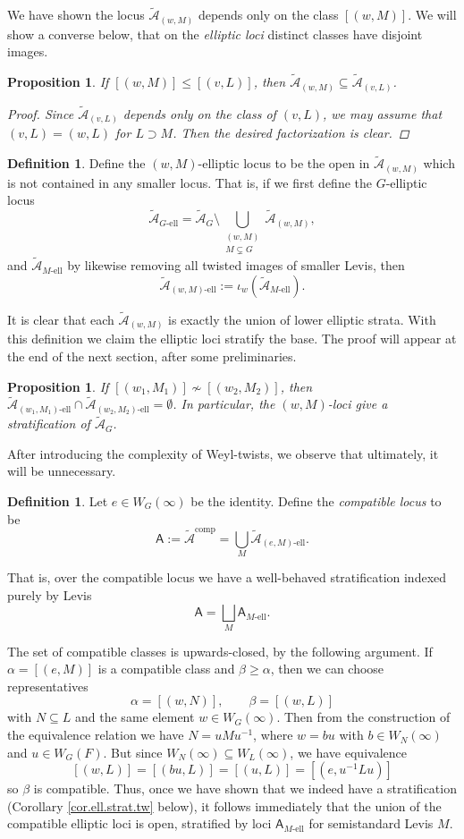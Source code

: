 \documentclass[openany]{amsbook}
\newtheorem{proposition}[theorem]{Proposition}
\theoremstyle{definition}
\newtheorem{definition}[theorem]{Definition}
\theoremstyle{remark}
\numberwithin{equation}{section}
\newcommand{\cA}{\mathcal{A}}
\renewcommand{\-}{\operatorname{-}}
\newcommand{\el}{\text{-ell}}
\newcommand{\ctA}{\widetilde{\cA}}
\newcommand{\ctAt}[2]{\ctA_{(#1,#2)}}
\newcommand{\ctAe}[2]{\ctA_{(#1, #2)\el}}
\newcommand{\bA}{\mathsf{A}}
\newcommand{\bAe}[1]{\bA_{#1\el}}
\newcommand{\comp}{\mathrm{comp}}
\begin{document}
We have shown the locus $\ctAt{w}{M}$ depends only on the class $[(w,M)]$. We will show a converse below, that on the \textit{elliptic loci} distinct classes have disjoint images.

\begin{proposition}
    If $[(w,M)] \le [(v,L)]$, then $\ctAt{w}{M} \subseteq \ctAt{v}{L}$.
    \begin{proof}
        Since $\ctAt{v}{L}$ depends only on the class of $(v,L)$, we may assume that $(v,L) = (w, L)$ for $L \supset M$. Then the desired factorization is clear.
    \end{proof}
\end{proposition}

\begin{definition}\label{def.wM.loci}
    Define the $(w,M)$-elliptic locus to be the open in $\ctAt{w}{M}$ which is not contained in any smaller locus. That is, if we first define the $G$-elliptic locus
    $$
        \ctA_{G\el} = \ctA_G \setminus \bigcup_{\substack{(w,M) \\ M \subsetneq G}} \ctAt{w}{M},
    $$
    and $\ctA_{M\el}$ by likewise removing all twisted images of smaller Levis, then 
    $$
        \ctA_{(w,M)\el} := \iota_w(\ctA_{M\el}).
    $$
\end{definition}

It is clear that each $\ctA_{(w,M)}$ is exactly the union of lower elliptic strata. With this definition we claim the elliptic loci stratify the base. 
The proof will appear at the end of the next section, after some preliminaries.
\begin{proposition}
    If $[(w_1,M_1)] \not\sim [(w_2, M_2)]$, then $\ctAe{w_1}{M_1} \cap \ctAe{w_2}{M_2} = \emptyset$. In particular, the $(w,M)$-loci give a stratification of $\ctA_G$.
\end{proposition}


After introducing the complexity of Weyl-twists, we observe that ultimately, it will be unnecessary.
\begin{definition}\label{def.comp.loc}
    Let $e \in W_G(\infty)$ be the identity. Define the \textit{compatible locus} to be
    $$\bA := \ctA^{\comp} = \bigcup_{M} \ctAe{e}{M}.$$
\end{definition}
That is, over the compatible locus we have a well-behaved stratification indexed purely by Levis
$$
    \bA = \bigsqcup_{M} \bAe{M}.
$$


The set of compatible classes is upwards-closed, by the following argument. If $\alpha = [(e,M)]$ is a compatible class and $\beta \ge \alpha$, then we can choose representatives
$$
    \alpha = [(w, N)], \qquad \beta = [(w, L)]
$$
with $N \subseteq L$ and the same element $w \in W_G(\infty)$. Then from the construction of the equivalence relation we have $N = u M u^{-1}$, where $w = b u$ with $b \in W_N(\infty)$ and $u \in W_G(F)$. But since $W_N(\infty) \subseteq W_L(\infty)$, we have equivalence
$$
    [(w, L)] = [(bu, L)] = [(u, L)] = [(e, u^{-1} L u)]
$$
so $\beta$ is compatible. Thus, once we have shown that we indeed have a stratification (Corollary \ref{cor.ell.strat.tw} below), it follows immediately that the union of the compatible elliptic loci is open, stratified by loci $\bAe{M}$ for semistandard Levis $M$. 
\end{document}

